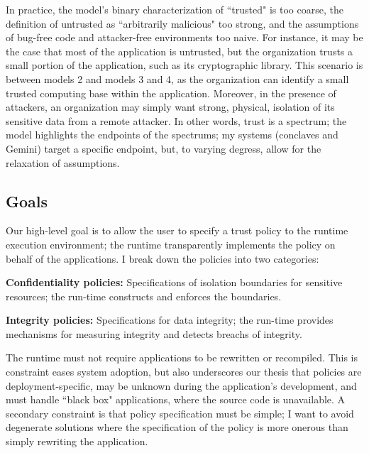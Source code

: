 In practice, the model's binary characterization of ``trusted" is too coarse,
the definition of untrusted as ``arbitrarily malicious" too strong,
and the assumptions of bug-free code and attacker-free environments too
naive.
%
For instance, it may be the case that most of the application is untrusted, but
the organization trusts a small portion of the application, such as its
cryptographic library.
%
This scenario is between models 2 and models 3 and 4, as the organization can
identify a small trusted computing base within the application.
%
Moreover, in the presence of attackers, an organization may simply
want strong, physical, isolation of its sensitive data from a remote attacker.
%
In other words, trust is a spectrum; the model highlights the endpoints of the
spectrums; my systems (conclaves and Gemini) target a specific endpoint, but,
to varying degress, allow for the relaxation of assumptions.



\subsection{Goals}

Our high-level goal is to allow the user to specify a trust policy to the
runtime execution environment; the runtime transparently implements the
policy on behalf of the applications.
%
I break down the policies into two categories:

\begin{widelist}
\item \textbf{Confidentiality policies:} Specifications of isolation boundaries for
    sensitive resources; the run-time constructs and enforces the boundaries.

\item \textbf{Integrity policies:} Specifications for data integrity; the run-time
    provides mechanisms for measuring integrity and detects breachs of
    integrity.
\end{widelist}


%
The runtime must not require applications to be rewritten or recompiled.
%
This is constraint eases system adoption, but also underscores our
thesis that policies are deployment-specific, may be unknown during the
application's development, and must handle ``black box" applications, where the
source code is unavailable.
%
A secondary constraint is that policy specification  must be simple; I want to avoid
degenerate solutions where the specification of the policy is more
onerous than simply rewriting the application.



